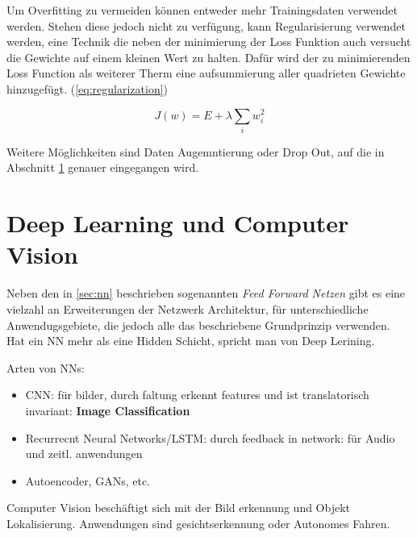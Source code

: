 

Um Overfitting zu vermeiden können entweder mehr Trainingsdaten verwendet werden. Stehen diese 
jedoch nicht zu verfügung, kann Regularisierung verwendet werden, eine Technik die neben der 
minimierung der Loss Funktion auch versucht die Gewichte auf einem kleinen Wert zu halten. 
Dafür wird der zu minimierenden Loss Function als weiterer 
Therm eine aufsummierung aller quadrieten Gewichte hinzugefügt. (\ref{eq:regularization}) 
\cite{geronHandsonMachineLearning2017}


\begin{equation}
    \label{eq:regularization}
    J(w) = E + \lambda \sum_{i} w_{i}^{2}
\end{equation}

Weitere Möglichkeiten sind Daten Augemntierung oder Drop Out, auf die 
in Abschnitt \ref{sec:deepl_cv} genauer eingegangen wird.



\section{Deep Learning und Computer Vision}\label{sec:deepl_cv}

Neben den in \ref{sec:nn} beschrieben sogenannten \textit{Feed Forward Netzen} 
gibt es eine vielzahl an Erweiterungen der Netzwerk Architektur, für unterschiedliche 
Anwendugsgebiete, die jedoch alle das beschriebene Grundprinzip verwenden.\\

Hat ein NN mehr als eine Hidden Schicht, spricht man von Deep Lerining.

Arten von NNs:
\begin{itemize}
    \item CNN: für bilder, durch faltung erkennt features und ist translatorisch invariant: \textbf{Image Classification}
    \item Recurrecnt Neural Networks/LSTM: durch feedback in network: für Audio und zeitl. anwendungen 
    \item Autoencoder, GANs, etc.
\end{itemize}

Computer Vision beschäftigt sich mit der Bild erkennung und Objekt Lokalisierung. 
Anwendungen sind gesichtserkennung oder Autonomes Fahren. 



